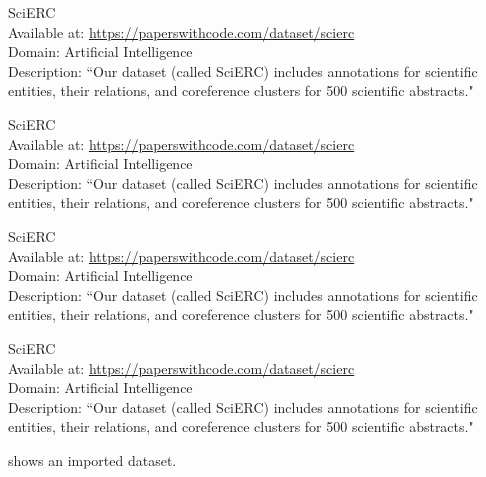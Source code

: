 \begin{dataset}
SciERC~\cite{DBLP:conf/emnlp/LuanHOH18}\\
Available at: \url{https://paperswithcode.com/dataset/scierc}\\
Domain: Artificial Intelligence\\
Description: ``Our dataset (called SciERC) includes annotations for scientific entities, their relations, and coreference clusters for 500 scientific abstracts."~\cite{DBLP:conf/emnlp/LuanHOH18}
\label{dataset:scierc16}
\end{dataset}
\begin{dataset}
SciERC~\cite{DBLP:conf/emnlp/LuanHOH18}\\
Available at: \url{https://paperswithcode.com/dataset/scierc}\\
Domain: Artificial Intelligence\\
Description: ``Our dataset (called SciERC) includes annotations for scientific entities, their relations, and coreference clusters for 500 scientific abstracts."~\cite{DBLP:conf/emnlp/LuanHOH18}
\label{dataset:scierc17}
\end{dataset}
\begin{dataset}
SciERC~\cite{DBLP:conf/emnlp/LuanHOH18}\\
Available at: \url{https://paperswithcode.com/dataset/scierc}\\
Domain: Artificial Intelligence\\
Description: ``Our dataset (called SciERC) includes annotations for scientific entities, their relations, and coreference clusters for 500 scientific abstracts."~\cite{DBLP:conf/emnlp/LuanHOH18}
\label{dataset:scierc18}
\end{dataset}
\begin{dataset}
SciERC~\cite{DBLP:conf/emnlp/LuanHOH18}\\
Available at: \url{https://paperswithcode.com/dataset/scierc}\\
Domain: Artificial Intelligence\\
Description: ``Our dataset (called SciERC) includes annotations for scientific entities, their relations, and coreference clusters for 500 scientific abstracts."~\cite{DBLP:conf/emnlp/LuanHOH18}
\label{dataset:scierc19}
\end{dataset}
 shows an imported dataset.

